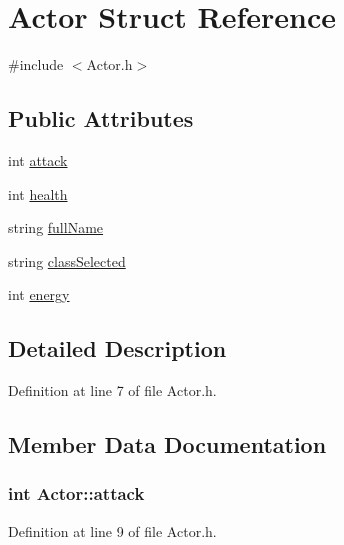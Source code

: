 \hypertarget{struct_actor}{}\section{Actor Struct Reference}
\label{struct_actor}


{\ttfamily \#include $<$Actor.\+h$>$}

\subsection*{Public Attributes}
\begin{DoxyCompactItemize}
\item 
int \hyperlink{struct_actor_a5e634d4da03f27502b3acd6babb6c94b}{attack}
\item 
int \hyperlink{struct_actor_a6932c660e6b6293a66b393c3c9cb151a}{health}
\item 
string \hyperlink{struct_actor_a2cadac890a05336b48e5b247901f5b08}{full\+Name}
\item 
string \hyperlink{struct_actor_a7950bfa41c5bb7a4ae04c925f800271e}{class\+Selected}
\item 
int \hyperlink{struct_actor_ab3bf461c752924b24b2b9a81250e5274}{energy}
\end{DoxyCompactItemize}


\subsection{Detailed Description}


Definition at line 7 of file Actor.\+h.



\subsection{Member Data Documentation}
\hypertarget{struct_actor_a5e634d4da03f27502b3acd6babb6c94b}{}
\subsubsection[{attack}]{\setlength{\rightskip}{0pt plus 5cm}int Actor\+::attack}\label{struct_actor_a5e634d4da03f27502b3acd6babb6c94b}


Definition at line 9 of file Actor.\+h.

\hypertarget{struct_actor_a7950bfa41c5bb7a4ae04c925f800271e}{}
